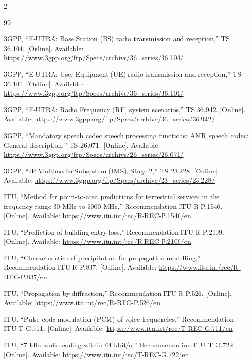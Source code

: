 \documentclass[9pt,a4paper]{article}
\begin{document}
\renewcommand{\refname}{References}
\begin{multicols}{2}
\begin{thebibliography}{99}
\setlength{\itemsep}{0pt}
\footnotesize

 3GPP, ``E-UTRA: Base Station (BS) radio transmission and reception,'' TS 36.104.
[Online]. Available: \url{https://www.3gpp.org/ftp/Specs/archive/36_series/36.104/}

 3GPP, ``E-UTRA: User Equipment (UE) radio transmission and reception,''
TS 36.101. [Online]. Available:
\url{https://www.3gpp.org/ftp/Specs/archive/36_series/36.101/}

 3GPP, ``E-UTRA: Radio Frequency (RF) system scenarios,'' TS 36.942. [Online].
Available: \url{https://www.3gpp.org/ftp/Specs/archive/36_series/36.942/}

 3GPP, ``Mandatory speech codec speech processing functions; AMR speech codec;
General description,'' TS 26.071. [Online]. Available:
\url{https://www.3gpp.org/ftp/Specs/archive/26_series/26.071/}

 3GPP, ``IP Multimedia Subsystem (IMS); Stage 2,'' TS 23.228. [Online].
Available: \url{https://www.3gpp.org/ftp/Specs/archive/23_series/23.228/}

 ITU, ``Method for point-to-area predictions for terrestrial services in the
frequency range 30 MHz to 3000 MHz,'' Recommendation ITU-R P.1546. [Online]. Available:
\url{https://www.itu.int/rec/R-REC-P.1546/en}

 ITU, ``Prediction of building entry loss,'' Recommendation ITU-R P.2109.
[Online]. Available: \url{https://www.itu.int/rec/R-REC-P.2109/en}

 ITU, ``Characteristics of precipitation for propagation modelling,''
Recommendation ITU-R P.837. [Online]. Available:
\url{https://www.itu.int/rec/R-REC-P.837/en}

 ITU, ``Propagation by diffraction,'' Recommendation ITU-R P.526. [Online].
Available: \url{https://www.itu.int/rec/R-REC-P.526/en}

 ITU, ``Pulse code modulation (PCM) of voice frequencies,'' Recommendation
ITU-T G.711. [Online]. Available: \url{https://www.itu.int/rec/T-REC-G.711/en}

 ITU, ``7 kHz audio-coding within 64 kbit/s,'' Recommendation ITU-T G.722.
[Online]. Available: \url{https://www.itu.int/rec/T-REC-G.722/en}


\end{thebibliography}
\end{multicols}
\end{document}
